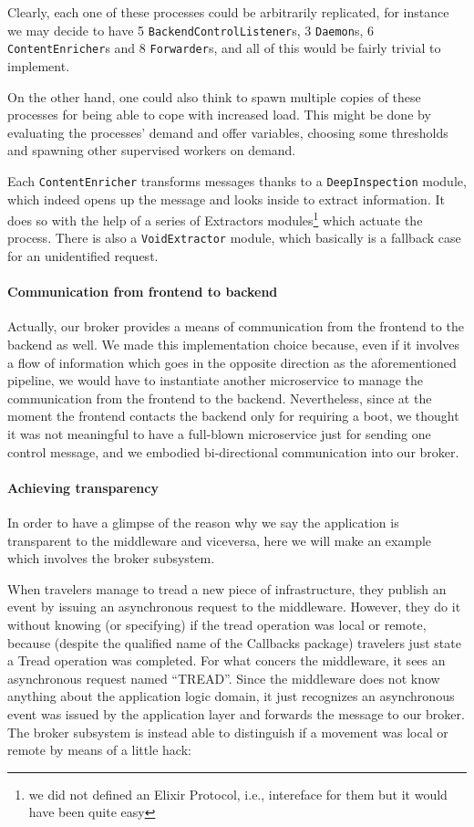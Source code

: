 Clearly, each one of these processes could be arbitrarily replicated, for
instance we may decide to have 5 \texttt{BackendControlListener}s, 3
\texttt{Daemon}s, 6 \texttt{ContentEnricher}s and 8 \texttt{Forwarder}s, and
all of this would be fairly trivial to implement.

On the other hand, one could also think to spawn multiple copies of these
processes for being able to cope with increased load.
This might be done by evaluating the processes' demand and offer variables,
choosing some thresholds and spawning other supervised workers on demand.

Each \texttt{ContentEnricher} transforms messages thanks to a
\texttt{DeepInspection} module, which indeed opens up the message and looks
inside to extract information.
It does so with the help of a series of Extractors modules\footnote{we did not
defined an Elixir Protocol, i.e., intereface for them but it would have been
quite easy} which actuate the process. There is also a \texttt{VoidExtractor}
module, which basically is a fallback case for an unidentified request.

\paragraph{Communication from frontend to backend}
Actually, our broker provides a means of communication from the frontend to
the backend as well.
We made this implementation choice because, even if it involves a flow of
information which goes in the opposite direction as the aforementioned
pipeline, we would have to instantiate another microservice to manage the
communication from the frontend to the backend.
Nevertheless, since at the moment the frontend contacts the backend only for
requiring a boot, we thought it was not meaningful to have a full-blown
microservice just for sending one control message, and we embodied
bi-directional communication into our broker.

\paragraph{Achieving transparency}
In order to have a glimpse of the reason why we say the application is
transparent to the middleware and viceversa, here we will make an example which
involves the broker subsystem.

When travelers manage to tread a new piece of infrastructure, they publish an
event by issuing an asynchronous request to the middleware. However, they do it
without knowing (or specifying) if the tread operation was local or remote,
because (despite the qualified name of the Callbacks package) travelers just
state a Tread operation was completed.
For what concers the middleware, it sees an asynchronous request named
``TREAD''. Since the middleware does not know anything about the application
logic domain, it just recognizes an asynchronous event was issued by the
application layer and forwards the message to our broker.
The broker subsystem is instead able to distinguish if a movement was local or
remote by means of a little hack:

